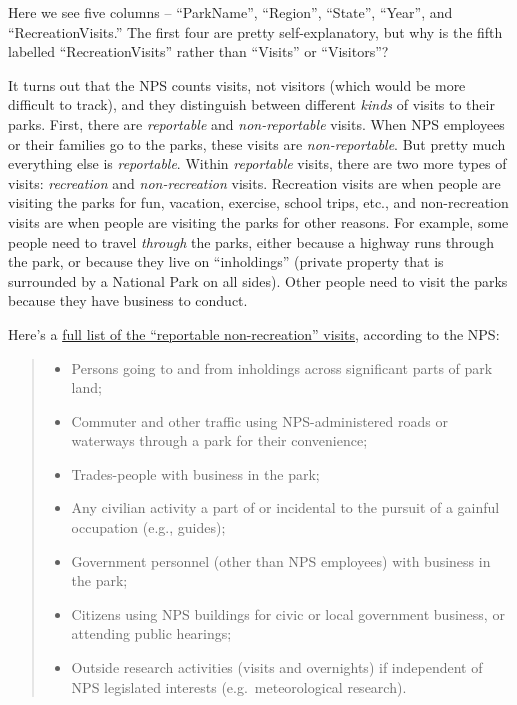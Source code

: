 \documentclass[
  letterpaper,
  DIV=11,
  numbers=noendperiod]{scrartcl}
\providecommand{\tightlist}{%
  \setlength{\itemsep}{0pt}\setlength{\parskip}{0pt}}\usepackage{longtable,booktabs,array}
\begin{document}
Here we see five columns -- ``ParkName'', ``Region'', ``State'',
``Year'', and ``RecreationVisits.'' The first four are pretty
self-explanatory, but why is the fifth labelled ``RecreationVisits''
rather than ``Visits'' or ``Visitors''?

It turns out that the NPS counts visits, not visitors (which would be
more difficult to track), and they distinguish between different
\emph{kinds} of visits to their parks. First, there are
\emph{reportable} and \emph{non-reportable} visits. When NPS employees
or their families go to the parks, these visits are
\emph{non-reportable}. But pretty much everything else is
\emph{reportable}. Within \emph{reportable} visits, there are two more
types of visits: \emph{recreation} and \emph{non-recreation} visits.
Recreation visits are when people are visiting the parks for fun,
vacation, exercise, school trips, etc., and non-recreation visits are
when people are visiting the parks for other reasons. For example, some
people need to travel \emph{through} the parks, either because a highway
runs through the park, or because they live on ``inholdings'' (private
property that is surrounded by a National Park on all sides). Other
people need to visit the parks because they have business to conduct.

Here's a
\href{https://www.nps.gov/subjects/socialscience/nps-visitor-use-statistics-definitions.htm}{full
list of the ``reportable non-recreation'' visits}, according to the NPS:

\begin{quote}
\begin{itemize}
\tightlist
\item
  Persons going to and from inholdings across significant parts of park
  land;
\item
  Commuter and other traffic using NPS-administered roads or waterways
  through a park for their convenience;
\item
  Trades-people with business in the park;
\item
  Any civilian activity a part of or incidental to the pursuit of a
  gainful occupation (e.g., guides);
\item
  Government personnel (other than NPS employees) with business in the
  park;
\item
  Citizens using NPS buildings for civic or local government business,
  or attending public hearings;
\item
  Outside research activities (visits and overnights) if independent of
  NPS legislated interests (e.g.~meteorological research).
\end{itemize}
\end{quote}
\end{document}
